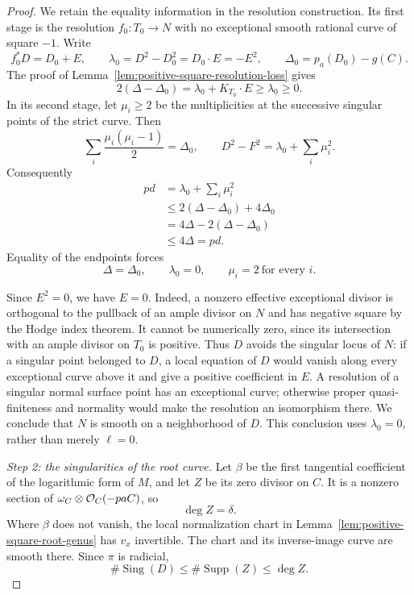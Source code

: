 \begin{proof}
We retain the equality information in the resolution construction.
Its first stage is the resolution $f_0:T_0\to N$ with no exceptional
smooth rational curve of square $-1$.
Write
\[
 f_0^*D=D_0+E,\qquad
 \lambda_0=D^2-D_0^2=D_0\cdot E=-E^2,\qquad
 \Delta_0=p_a(D_0)-g(C).
\]
The proof of Lemma~\ref{lem:positive-square-resolution-loss} gives
\[
 2(\Delta-\Delta_0)
   =\lambda_0+K_{T_0}\cdot E\geq\lambda_0\geq0.
\]
In its second stage, let $\mu_i\geq2$ be the multiplicities
at the successive singular points of the strict curve.
Then
\[
 \sum_i\frac{\mu_i(\mu_i-1)}2=\Delta_0,\qquad
 D^2-F^2=\lambda_0+\sum_i\mu_i^2.
\]
Consequently
\begin{align*}
 pd
 &=\lambda_0+\sum_i\mu_i^2\\
 &\leq2(\Delta-\Delta_0)+4\Delta_0\\
 &=4\Delta-2(\Delta-\Delta_0)\\
 &\leq4\Delta=pd.
\end{align*}
Equality of the endpoints forces
\begin{equation}\label{eq:odd-endpoint-resolution-equalities}
 \Delta=\Delta_0,\qquad \lambda_0=0,\qquad
 \mu_i=2\ \text{for every }i.
\end{equation}

Since $E^2=0$, we have $E=0$.
Indeed, a nonzero effective exceptional divisor is orthogonal to
the pullback of an ample divisor on $N$ and has negative square
by the Hodge index theorem.
It cannot be numerically zero, since its intersection with an
ample divisor on $T_0$ is positive.
Thus $D$ avoids the singular locus of $N$:
if a singular point belonged to $D$, a local equation of $D$
would vanish along every exceptional curve above it and give
a positive coefficient in $E$.
A resolution of a singular normal surface point has an
exceptional curve; otherwise proper quasi-finiteness and
normality would make the resolution an isomorphism there.
We conclude that $N$ is smooth on a neighborhood of $D$.
This conclusion uses $\lambda_0=0$, rather than merely $\ell=0$.

\emph{Step 2: the singularities of the root curve.}
Let $\beta$ be the first tangential coefficient of the logarithmic
form of $M$, and let $Z$ be its zero divisor on $C$.
It is a nonzero section of
$\omega_C\otimes\mathcal O_C(-paC)$, so
\[
 \deg Z=\delta.
\]
Where $\beta$ does not vanish, the local normalization chart
in Lemma~\ref{lem:positive-square-root-genus} has $v_x$ invertible.
The chart and its inverse-image curve are smooth there.
Since $\pi$ is radicial,
\begin{equation}\label{eq:odd-endpoint-count}
 \#\operatorname{Sing}(D)
 \leq\#\operatorname{Supp}(Z)\leq\deg Z.
\end{equation}


\end{proof}
